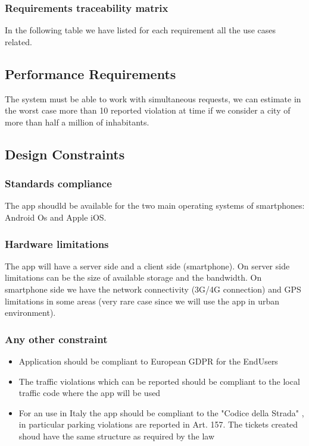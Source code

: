 \subsubsection{Requirements traceability matrix}
In the following table we have listed for each requirement all the use cases related.




\subsection{Performance Requirements}
The system must be able to work with simultaneous requests, we can estimate in the worst case more than 10 reported violation at time if we consider a city of more than half a million of inhabitants.

\subsection{Design Constraints}
\subsubsection{Standards compliance}
The app shoudld be available for the two main operating systems of smartphones: Android Os and Apple iOS.\\


\subsubsection{Hardware limitations}
The app will have a server side and a client side (smartphone).
On server side limitations can be the size of available storage and the bandwidth.
On smartphone side we have the network connectivity (3G/4G connection) and GPS limitations in some areas (very rare case since we will use the app in urban environment).

\subsubsection{Any other constraint}
\begin{itemize}
\item Application should be compliant to European GDPR for the EndUsers
\item The traffic violations which can be reported should be compliant to the local traffic code where the app will be used
\item For an use in Italy the app should be compliant to the "Codice della Strada" \cite{codicestrada}, in particular parking violations are reported in Art. 157. The tickets created shoud have the same structure as required by the law \\
\end{itemize}

